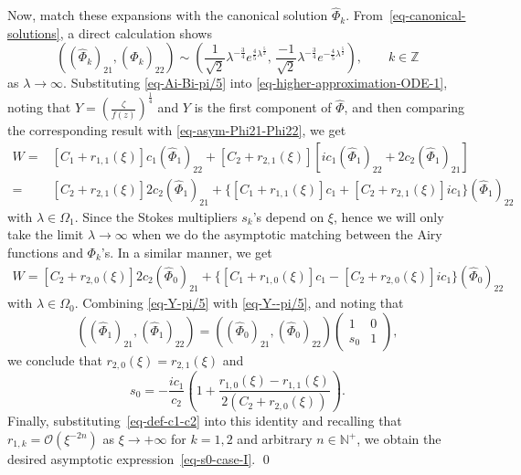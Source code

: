 \documentclass[12pt]{article}
\theoremstyle{plain}
\theoremstyle{definition}
\numberwithin{equation}{section}
\begin{document}
Now, match these expansions with the canonical solution $\widehat{\Phi}_k$. From~\eqref{eq-canonical-solutions}, a direct calculation shows
\begin{equation}\label{eq-asym-Phi21-Phi22}
\left((\widehat{\Phi}_{k})_{21},(\widehat{\Phi}_{k})_{22}\right)\sim \left(\frac{1}{\sqrt{2}}\lambda^{-\frac{3}{4}}e^{\frac{4}{5}\lambda^{\frac{5}{2}}},\,
\frac{-1}{\sqrt{2}}\lambda^{-\frac{3}{4}}e^{-\frac{4}{5}\lambda^{\frac{5}{2}}}\right),
\qquad k\in\mathbb{Z}
\end{equation}
as $\lambda\to\infty$.
Substituting \eqref{eq-Ai-Bi-pi/5} into \eqref{eq-higher-approximation-ODE-1}, noting that $Y=\left(\frac{\zeta}{f(z)}\right)^{\frac{1}{4}}$ and $Y$ is the first component of $\widehat{\Phi}$,
and then comparing the corresponding result with \eqref{eq-asym-Phi21-Phi22},
we get
\begin{equation}\label{eq-Y-pi/5}
\begin{split}
W= &[C_{1}+r_{1,1}(\xi)]c_{1}(\widehat{\Phi}_{1})_{22}+[C_{2}+r_{2,1}(\xi)][ic_{1}(\widehat{\Phi}_{1})_{22}+2c_{2}(\widehat{\Phi}_{1})_{21}]\\
=&[C_{2}+r_{2,1}(\xi)]2c_{2}(\widehat{\Phi}_{1})_{21}+\{[C_{1}+r_{1,1}(\xi)]c_{1}+[C_{2}+r_{2,1}(\xi)]ic_{1}\}(\widehat{\Phi}_{1})_{22}
\end{split}
\end{equation}
with $\lambda\in\Omega_{1}$. Since the Stokes multipliers $s_{k}$'s depend on $\xi$,
hence we will only take the limit $\lambda\to\infty$
when we do the asymptotic matching between the Airy functions and $\Phi_{k}$'s. In a similar manner, we get
\begin{equation}\label{eq-Y--pi/5}
\begin{split}
W=[C_{2}+r_{2,0}(\xi)]2c_{2}(\widehat{\Phi}_{0})_{21}+\{[C_{1}+r_{1,0}(\xi)]c_{1}-[C_{2}+r_{2,0}(\xi)]ic_{1}\}(\widehat{\Phi}_{0})_{22}
\end{split}
\end{equation}
with $\lambda\in\Omega_{0}$.
Combining \eqref{eq-Y-pi/5} with \eqref{eq-Y--pi/5}, and noting that
$$\left((\widehat{\Phi}_{1})_{21},(\widehat{\Phi}_{1})_{22}\right)=\left((\widehat{\Phi}_{0})_{21},(\widehat{\Phi}_{0})_{22}\right)\left(\begin{matrix}1&0\\s_{0}&1\end{matrix}\right),$$
we conclude that $r_{2,0}(\xi)=r_{2,1}(\xi)$ and
\begin{equation}
s_{0}=-\frac{ic_{1}}{c_{2}}\left(1+\frac{r_{1,0}(\xi)-r_{1,1}(\xi)}{2(C_{2}+r_{2,0}(\xi))}\right).
\end{equation}
Finally, substituting~\eqref{eq-def-c1-c2} into this identity and recalling that $r_{1,k} = \mathcal{O}(\xi^{-2n})$ as $\xi \to +\infty$ for $k=1,2$ and arbitrary $n \in \mathbb{N}^{+}$, we obtain the desired asymptotic expression~\eqref{eq-s0-case-I}. \qed
\end{document}
